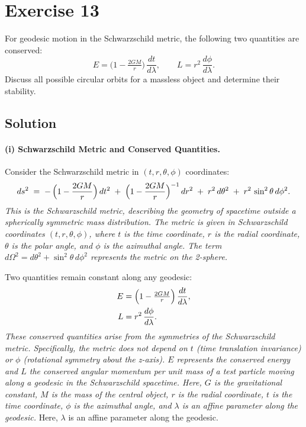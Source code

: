 \pagebreak

\pagebreak

\section*{Exercise 13}
For geodesic motion in the Schwarzschild metric, the following two quantities are conserved:
\[
E = \bigl(1 - \tfrac{2 G M}{r}\bigr)\,\frac{dt}{d\lambda},
\qquad
L = r^{2}\,\frac{d\phi}{d\lambda}.
\]
Discuss all possible circular orbits for a massless object and determine their stability.

\subsection*{Solution}

\paragraph{(i) Schwarzschild Metric and Conserved Quantities.}
Consider the Schwarzschild metric in \((t,r,\theta,\phi)\) coordinates:
\begin{equation}
ds^2 \;=\; -\,\Bigl(1 - \frac{2GM}{r}\Bigr)\,dt^2
\;+\;
\Bigl(1 - \frac{2GM}{r}\Bigr)^{-1}\,dr^2
\;+\;
r^2\,d\theta^2
\;+\;
r^2\,\sin^2\theta\,d\phi^2.
\end{equation}
\textit{This is the Schwarzschild metric, describing the geometry of spacetime outside a spherically symmetric mass distribution. The metric is given in Schwarzschild coordinates $(t, r, \theta, \phi)$, where $t$ is the time coordinate, $r$ is the radial coordinate, $\theta$ is the polar angle, and $\phi$ is the azimuthal angle. The term $d\Omega^2 = d\theta^2 + \sin^2\theta \, d\phi^2$ represents the metric on the 2-sphere.}

Two quantities remain constant along any geodesic:
\begin{align}
E &= \Bigl(1 - \tfrac{2GM}{r}\Bigr)\,\frac{dt}{d\lambda},\\
L &= r^2\,\frac{d\phi}{d\lambda}.
\end{align}
\textit{These conserved quantities arise from the symmetries of the Schwarzschild metric. Specifically, the metric does not depend on $t$ (time translation invariance) or $\phi$ (rotational symmetry about the z-axis). $E$ represents the conserved energy and $L$ the conserved angular momentum per unit mass of a test particle moving along a geodesic in the Schwarzschild spacetime. Here, $G$ is the gravitational constant, $M$ is the mass of the central object, $r$ is the radial coordinate, $t$ is the time coordinate, $\phi$ is the azimuthal angle, and $\lambda$ is an affine parameter along the geodesic.}
Here, \(\lambda\) is an affine parameter along the geodesic.

